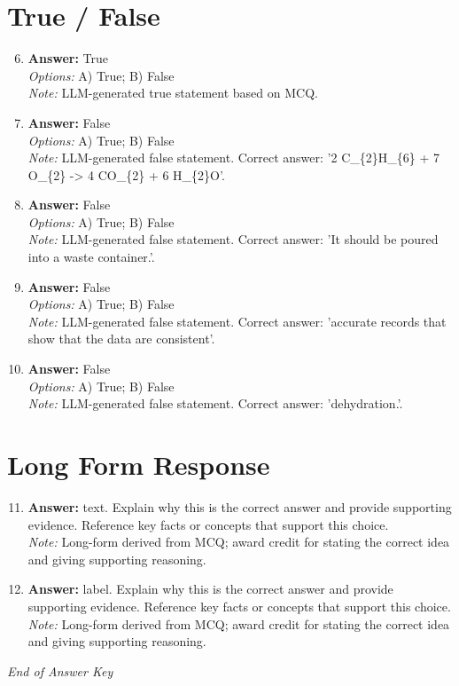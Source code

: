 \documentclass[12pt]{article}
\begin{document}
\section*{True / False}
\begin{enumerate}[label=\arabic*.]
\setcounter{enumi}{5}
\item \textbf{Answer:} True
\\ \textit{Options:} A) True; B) False
\\ \textit{Note:} LLM-generated true statement based on MCQ.
\item \textbf{Answer:} False
\\ \textit{Options:} A) True; B) False
\\ \textit{Note:} LLM-generated false statement. Correct answer: '2 C\_\{2\}H\_\{6\} + 7 O\_\{2\} -\textgreater{} 4 CO\_\{2\} + 6 H\_\{2\}O'.
\item \textbf{Answer:} False
\\ \textit{Options:} A) True; B) False
\\ \textit{Note:} LLM-generated false statement. Correct answer: 'It should be poured into a waste container.'.
\item \textbf{Answer:} False
\\ \textit{Options:} A) True; B) False
\\ \textit{Note:} LLM-generated false statement. Correct answer: 'accurate records that show that the data are consistent'.
\item \textbf{Answer:} False
\\ \textit{Options:} A) True; B) False
\\ \textit{Note:} LLM-generated false statement. Correct answer: 'dehydration.'.
\end{enumerate}

\section*{Long Form Response}
\begin{enumerate}[label=\arabic*.]
\setcounter{enumi}{10}
\item \textbf{Answer:} text. Explain why this is the correct answer and provide supporting evidence. Reference key facts or concepts that support this choice.
\\ \textit{Note:} Long-form derived from MCQ; award credit for stating the correct idea and giving supporting reasoning.
\item \textbf{Answer:} label. Explain why this is the correct answer and provide supporting evidence. Reference key facts or concepts that support this choice.
\\ \textit{Note:} Long-form derived from MCQ; award credit for stating the correct idea and giving supporting reasoning.
\end{enumerate}

\vfill
\noindent\textit{End of Answer Key}
\end{document}
